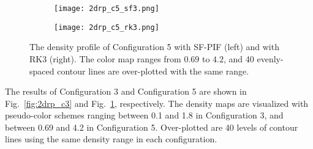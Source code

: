 \documentclass[times,preprint,3p]{elsarticle}
\begin{document}
\begin{figure}[ht!]
    \centering
    \begin{subfigure}{80mm}
        \centering
        \texttt{[image: 2drp\_c5\_sf3.png]}
    \end{subfigure}
    \begin{subfigure}{80mm}
        \centering
        \texttt{[image: 2drp\_c5\_rk3.png]}
    \end{subfigure}
    \caption{The density profile of Configuration 5
        with SF-PIF (left) and with RK3 (right).
        The color map ranges from \( 0.69 \) to \( 4.2 \), and
        40 evenly-spaced contour lines are over-plotted with
        the same range.
    }\label{fig:2drp_c5}
\end{figure}
%


The results of Configuration 3 and Configuration 5 are shown in Fig.~\ref{fig:2drp_c3}
and Fig.~\ref{fig:2drp_c5}, respectively.
The density maps are visualized with
pseudo-color schemes ranging between 0.1 and 1.8 in Configuration 3,
and between 0.69 and 4.2 in Configuration 5.
Over-plotted are
40 levels of contour lines using the same density range
in each configuration.
%
%
\end{document}
